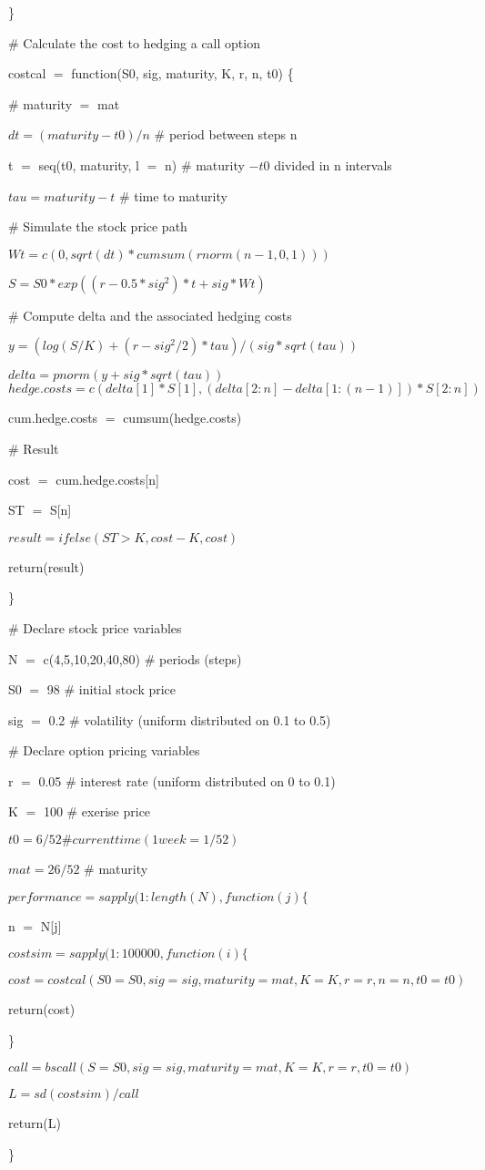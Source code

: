 \documentclass{article}
\begin{document}
\}

\# Calculate the cost to hedging a call option

costcal $=$ function(S0, sig, maturity, K, r, n, t0) \{

\# maturity $=$ mat

$ dt = (maturity - t0)/n$  \# period between steps n

t $=$ seq(t0, maturity, l $=$ n) \# maturity $- t0$ divided in n intervals

$tau = maturity - t$  \# time to maturity

\# Simulate the stock price path

$Wt = c(0, sqrt(dt) * cumsum(rnorm(n - 1, 0, 1)))$

$S = S0 * exp((r - 0.5 * sig^2) * t + sig * Wt)$

\# Compute delta and the associated hedging costs

$y = (log(S/K) + (r - sig^2/2) * tau)/(sig * sqrt(tau))$

$delta = pnorm(y + sig * sqrt(tau))$
$hedge.costs = c(delta[1] * S[1], (delta[2:n] - delta[1:(n - 1)]) * S[2:n])$

cum.hedge.costs $=$ cumsum(hedge.costs)

\# Result

cost $=$ cum.hedge.costs[n]

ST $=$ S[n]

$result = ifelse(ST>K, cost-K, cost)$

return(result)

\}

\# Declare stock price variables

N $=$ c(4,5,10,20,40,80) \# periods (steps)

S0 $=$ 98  \# initial stock price

sig $=$ 0.2  \# volatility (uniform distributed on 0.1 to 0.5)

\# Declare option pricing variables

r $=$ 0.05 \# interest rate (uniform distributed on 0 to 0.1)

K $=$ 100 \# exerise price

$t0 = 6/52  \# current time (1 week = 1/52)$

$mat = 26/52$ \# maturity

$performance = sapply(1:length(N), function(j) \{$

n $=$ N[j]

$ costsim=sapply(1:100000,function(i) \{ $

$cost = costcal(S0 = S0, sig = sig, maturity = mat, K = K, r = r, n = n, t0 = t0)$

return(cost)

\}

$ call = bscall (S = S0, sig = sig, maturity = mat, K = K, r = r, t0 = t0)$

$L = sd(costsim) / call $

return(L)

\}
\end{document}
